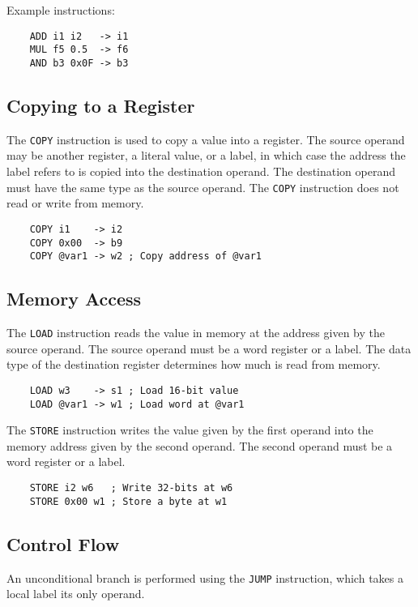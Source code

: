 Example instructions:

\begin{verbatim}
    ADD i1 i2   -> i1
    MUL f5 0.5  -> f6
    AND b3 0x0F -> b3
\end{verbatim}

\subsection{Copying to a Register}

The \texttt{COPY} instruction is used to copy a value into
a register. The source operand may be another register,
a literal value, or a label, in which case the address
the label refers to is copied into the destination operand.
The destination operand must have the same type as the source operand.
The \texttt{COPY} instruction does not read or write from memory.

\begin{verbatim}
    COPY i1    -> i2
    COPY 0x00  -> b9
    COPY @var1 -> w2 ; Copy address of @var1
\end{verbatim}

\subsection{Memory Access}

The \texttt{LOAD} instruction reads the value in memory
at the address given by the source operand. The source operand
must be a word register or a label. The data type of the
destination register determines how much is read from memory.

\begin{verbatim}
    LOAD w3    -> s1 ; Load 16-bit value
    LOAD @var1 -> w1 ; Load word at @var1
\end{verbatim}

The \texttt{STORE} instruction writes the value given by
the first operand into the memory address given by the
second operand. The second operand must be a word register
or a label.

\begin{verbatim}
    STORE i2 w6   ; Write 32-bits at w6
    STORE 0x00 w1 ; Store a byte at w1
\end{verbatim}

\subsection{Control Flow}

An unconditional branch is performed using the \texttt{JUMP} instruction, which
takes a local label its only operand.

